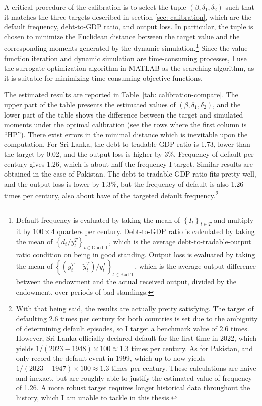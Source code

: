 A critical procedure of the calibration is to select the tuple $(\beta, \delta_1, \delta_2)$ such that it matches the three targets described in section \ref{sec: calibration}, which are the default frequency, debt-to-GDP ratio, and output loss.
In particular, the tuple is chosen to minimize the Euclidean distance between the target value and the corresponding moments generated by the dynamic simulation.\footnote{
    Default frequency is evaluated by taking the mean of $\left\{ I_{t} \right\}_{t \in T}$ and multiply it by $100\times 4$ quarters per century. Debt-to-GDP ratio is calculated by taking the mean of $\left\{ d_t / y^T_t \right\}_{t \in \text{Good T}}$, which is the average debt-to-tradable-output ratio condition on being in good standing. Output loss is evaluated by taking the mean of $\left\{ (y^T_t - \tilde{y}^T_t)/y^T_t \right\}_{t \in \text{Bad T}}$, which is the average output difference between the endowment and the actual received output, divided by the endowment, over periods of bad standings.
}
Since the value function iteration and dynamic simulation are time-consuming processes, I use the surrogate optimization algorithm in MATLAB as the searching algorithm, as it is suitable for minimizing time-consuming objective functions.

The estimated results are reported in Table~\ref{tab: calibration-compare}.
The upper part of the table presents the estimated values of $(\beta, \delta_1, \delta_2)$, and the lower part of the table shows the difference between the target and simulated moments under the optimal calibration (see the rows where the first column is ``HP'').
There exist errors in the minimal distance which is inevitable upon the computation. For Sri Lanka, the debt-to-tradable-GDP ratio is 1.73, lower than the target by 0.02, and the output loss is higher by 3\%. Frequency of default per century gives 1.26, which is about half the frequency I target. Similar results are obtained in the case of Pakistan. The debt-to-tradable-GDP ratio fits pretty well, and the output loss is lower by 1.3\%, but the frequency of default is also 1.26 times per century, also about have of the targeted default frequency.\footnote{
    With that being said, the results are actually pretty satisfying. The target of defaulting 2.6 times per century for both countries is set due to the ambiguity of determining default episodes, so I target a benchmark value of 2.6 times. However, Sri Lanka officially declared default for the first time in 2022, which yields $1/(2023-1948) \times 100 \approx 1.3$ times per century. As for Pakistan, \citet{Uribe-Schmitt-Grohe-textbook} and \citet{SPGlobal-default-report} only record the default event in 1999, which up to now yields $1/(2023-1947) \times 100 \approx 1.3$ times per century. These calculations are naive and inexact, but are roughly able to justify the estimated value of frequency of 1.26. A more robust target requires longer historical data throughout the history, which I am unable to tackle in this thesis.
}
